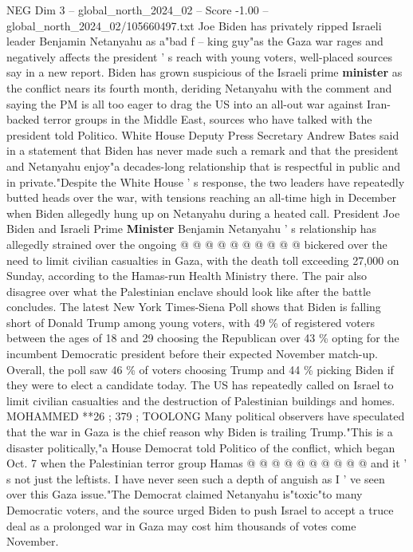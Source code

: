 \begin{textsample}{NEG Dim 3 – global\_north\_2024\_02 – Score -1.00 – global\_north\_2024\_02/105660497.txt}  \label{ex:f3_neg_207}
Joe Biden has privately ripped Israeli leader Benjamin Netanyahu as a"bad f -- king guy"as the Gaza war rages and negatively affects the president ' s reach with young voters, well-placed sources say in a new report.
Biden has grown suspicious of the Israeli prime \textbf{minister} as the conflict nears its fourth month, deriding Netanyahu with the comment and saying the PM is all too eager to drag the US into an all-out war against Iran-backed terror groups in the Middle East, sources who have talked with the president told Politico.
White House Deputy Press Secretary Andrew Bates said in a statement that Biden has never made such a remark and that the president and Netanyahu enjoy"a decades-long relationship that is respectful in public and in private."Despite the White House ' s response, the two leaders have repeatedly butted heads over the war, with tensions reaching an all-time high in December when Biden allegedly hung up on Netanyahu during a heated call.
President Joe Biden and Israeli Prime \textbf{Minister} Benjamin Netanyahu ' s relationship has allegedly strained over the ongoing @ @ @ @ @ @ @ @ @ @ bickered over the need to limit civilian casualties in Gaza, with the death toll exceeding 27,000 on Sunday, according to the Hamas-run Health Ministry there.
The pair also disagree over what the Palestinian enclave should look like after the battle concludes.
The latest New York Times-Siena Poll shows that Biden is falling short of Donald Trump among young voters, with 49 \% of registered voters between the ages of 18 and 29 choosing the Republican over 43 \% opting for the incumbent Democratic president before their expected November match-up.
Overall, the poll saw 46 \% of voters choosing Trump and 44 \% picking Biden if they were to elect a candidate today.
The US has repeatedly called on Israel to limit civilian casualties and the destruction of Palestinian buildings and homes.
MOHAMMED **26 ; 379 ; TOOLONG Many political observers have speculated that the war in Gaza is the chief reason why Biden is trailing Trump."This is a disaster politically,"a House Democrat told Politico of the conflict, which began Oct. 7 when the Palestinian terror group Hamas @ @ @ @ @ @ @ @ @ @ and it ' s not just the leftists.
I have never seen such a depth of anguish as I ' ve seen over this Gaza issue."The Democrat claimed Netanyahu is"toxic"to many Democratic voters, and the source urged Biden to push Israel to accept a truce deal as a prolonged war in Gaza may cost him thousands of votes come November.

\end{textsample}
